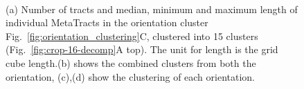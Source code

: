 \begin{figure}
\centering
{}\\
\caption{(a) Number of tracts and median, minimum and maximum length of individual MetaTracts in the orientation cluster Fig.~\ref{fig:orientation_clustering}C, clustered into 15 clusters (Fig.~\ref{fig:crop-16-decomp}A top). The unit for length is the grid cube length.(b) shows the combined clusters from both the orientation, (c),(d) show the clustering of each orientation.}
\label{fig:radius_3}
\end{figure}